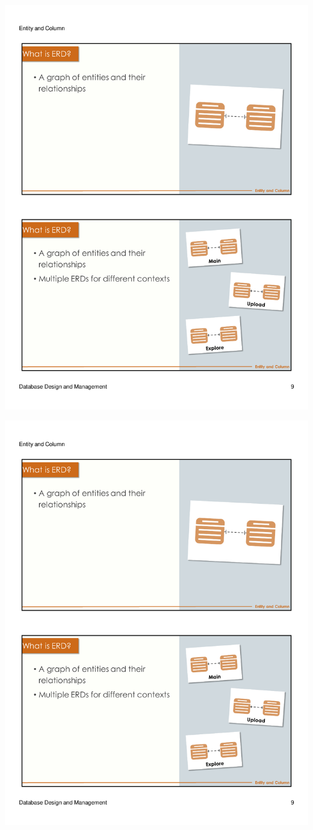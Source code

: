 \begin{frame}{ }
    \centering
    \includegraphics[width=\textwidth, trim={10mm 134mm 10mm 22mm}, clip]{resources/02/02_9}
\end{frame}
\begin{frame}{ }
    \centering
    \includegraphics[width=\textwidth, trim={10mm 24mm 10mm 134mm}, clip]{resources/02/02_9}
\end{frame}
